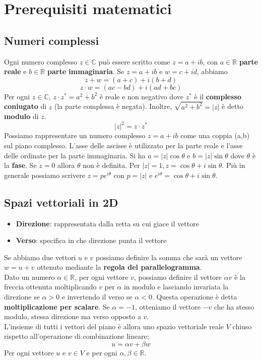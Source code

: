 \documentclass[12pt, a4paper]{report}
\begin{document}
\section{Prerequisiti matematici}
\subsection{Numeri complessi}
Ogni numero complesso $z\in \mathbb{C}$ può essere scritto come $z=a+ib$, con $a\in \mathbb{R}$ \textbf{parte reale} e $b\in \mathbb{R}$ \textbf{parte immaginaria}. Se $z=a+ib$ e $w=c+id$, abbiamo
\begin{equation*}
    z+w = (a+c) + i(b+d)
\end{equation*}
\begin{equation*}
    z\cdot w = (ac-bd) + i(ad+bc)
\end{equation*}
Per ogni $z\in \mathbb{C}$, $z\cdot z^{*}=a^{2}+b^{2}$ è reale e non negativo dove $z^{*}$ è il \textbf{complesso coniugato} di $z$ (la parte complessa è negata). Inoltre, $\sqrt{a^{2}+b^{2}}=\lvert z\rvert$ è detto \textbf{modulo} di $z$.
\begin{equation*}
    \lvert z\rvert^{2} = z\cdot z^{*}
\end{equation*}
Possiamo rappresentare un numero complesso $z=a+ib$ come una coppia (a,b) sul piano complesso. L'asse delle ascisse è utilizzato per la parte reale e l'asse delle ordinate per la parte immaginaria. Si ha $a = \lvert z \rvert \cos \theta$ e $b = \lvert z \rvert \sin \theta$ dove $\theta$ è la \textbf{fase}. Se $z=0$ allora $\theta$ non è definita. Per $\lvert z \rvert = 1, z=\cos\theta + i\sin\theta$. Più in generale possiamo scrivere $z=pe^{i\theta}$ con $p=\lvert z \rvert$ e $e^{i\theta}=\cos\theta + i\sin\theta$.
\subsection{Spazi vettoriali in 2D}
\begin{itemize}
    \item \textbf{Direzione}: rappresentata dalla retta su cui giace il vettore
    \item \textbf{Verso}:  specifica in che direzione punta il vettore
\end{itemize}
Se abbiamo due vettori $u$ e $v$ possiamo definire la somma che sarà un vettore $w=u+v$ ottenuto mediante la \textbf{regola del parallelogramma}.\\
Dato un numero $\alpha\in \mathbb{R}$, per ogni vettore $v$, possiamo definire il vettore $\alpha v$ è la freccia ottenuta moltiplicando $v$ per $\alpha$ in modulo e lasciando invariata la direzione se $\alpha > 0$ e invertendo il verso se $\alpha < 0$. Questa operazione è detta \textbf{moltiplicazione per scalare}. Se $\alpha = -1$, otteniamo il vettore $-v$ che ha stesso modulo, stessa direzione ma verso opposto a $v$.\\
L'insieme di tutti i vettori del piano è allora uno spazio vettoriale reale $V$ chiuso rispetto all'operazione di combinazione lineare:
\begin{equation*}
    u = \alpha v + \beta w
\end{equation*}
Per ogni vettore $u$ e $v \in V$ e per ogni $\alpha, \beta \in \mathbb{R}$.
\end{document}

